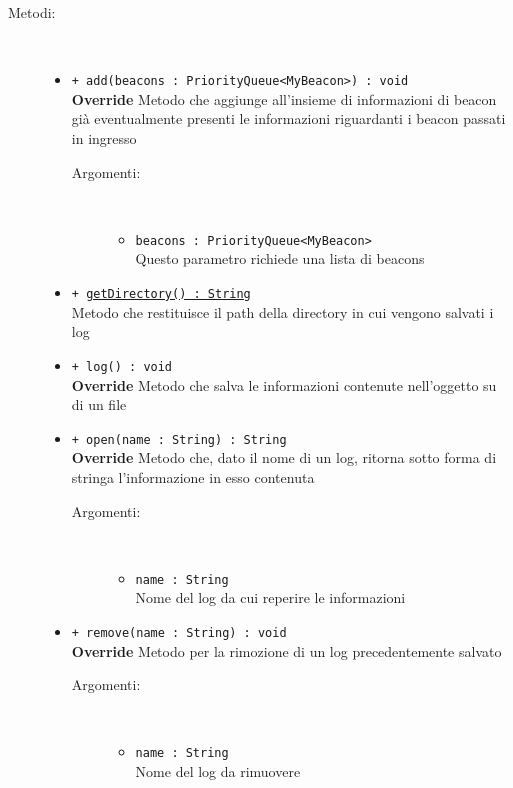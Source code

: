 \documentclass[../DefinizioneDiProdotto.tex]{subfiles}
\begin{document}
\begin{description}
\begin{itemize}
\end{itemize}
\item[Metodi:] \
\begin{itemize}
\item \texttt{+ add(beacons : PriorityQueue<MyBeacon>) : void}\\
\textbf{Override} Metodo che aggiunge all'insieme di informazioni di beacon già eventualmente presenti le informazioni riguardanti i beacon passati in ingresso
 \begin{description}
\item[Argomenti:] \
\begin{itemize}
\item \texttt{beacons : PriorityQueue<MyBeacon>}\\
Questo parametro richiede una lista di beacons\end{itemize}
\end{description}
\item \texttt{+ \underline{getDirectory() : String}}\\
Metodo che restituisce il path della directory in cui vengono salvati i log
 \item \texttt{+ log() : void}\\
\textbf{Override} Metodo che salva le informazioni contenute nell'oggetto su di un file
 \item \texttt{+ open(name : String) : String}\\
\textbf{Override} Metodo che, dato il nome di un log, ritorna sotto forma di stringa l'informazione in esso contenuta
 \begin{description}
\item[Argomenti:] \
\begin{itemize}
\item \texttt{name : String}\\
Nome del log da cui reperire le informazioni\end{itemize}
\end{description}
\item \texttt{+ remove(name : String) : void}\\
\textbf{Override} Metodo per la rimozione di un log precedentemente salvato
 \begin{description}
\item[Argomenti:] \
\begin{itemize}
\item \texttt{name : String}\\
Nome del log da rimuovere\end{itemize}

\end{description}
\end{itemize}
\end{description}
\end{document}
